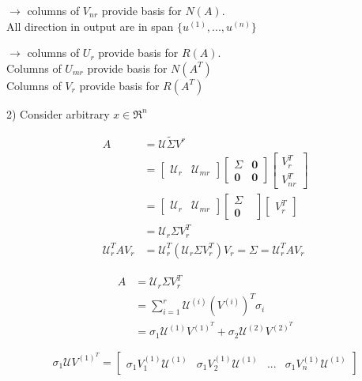 $\rightarrow$ columns of $V_{nr}$ provide basis for $N(A)$.\\


All direction in output are in span $\{u^{(1)} ,..., u^{(n)}\}$

$\rightarrow$ columns of $U_r$ provide basis for $R(A)$.\\

Columns of $U_{mr}$ provide basis for $N(A^T)$\\

Columns of $V_{r}$ provide basis for $R(A^T)$


2) Consider arbitrary $x\in \Re^n$

\begin{align*}
A &= \mathcal{U}\tilde{\Sigma}V^r\\
&= 
\begin{bmatrix}
\mathcal{U}_r & \mathcal{U}_{mr}
\end{bmatrix}
\begin{bmatrix}
\Sigma & \mathbf{0}\\
\mathbf{0} & \mathbf{0}
\end{bmatrix}
\begin{bmatrix}
V_r^T\\
V_{nr}^T
\end{bmatrix}\\
&= 
\begin{bmatrix}
\mathcal{U}_r & \mathcal{U}_{mr}
\end{bmatrix}
\begin{bmatrix}
\Sigma \\
\mathbf{0} & 
\end{bmatrix}
\begin{bmatrix}
V_r^T
\end{bmatrix}\\
&= \mathcal{U}_r\Sigma V_r^T\\
\mathcal{U}_r^TAV_r &= \mathcal{U}_r^T(\mathcal{U}_r\Sigma V_r^T)V_r = \Sigma = \mathcal{U}_r^TAV_r
\end{align*}


\begin{align}
A &= \mathcal{U}_r\Sigma V_r^T \\
&= \sum^r_{i=1}\mathcal{U}^{(i)}(V^{(i)})^T\sigma_i\\
&= \sigma_1\mathcal{U}^{(1)}V^{(1)^T}+ \sigma_2\mathcal{U}^{(2)}V^{(2)^T}
\end{align}

\begin{equation*}
\sigma_1\mathcal{U}V^{(1)^T} = 
\begin{bmatrix}
\sigma_1V_1^{(1)}\mathcal{U}^{(1)} & \sigma_1V_2^{(1)}\mathcal{U}^{(1)} & ... & \sigma_1V_n^{(1)}\mathcal{U}^{(1)}
\end{bmatrix}
\end{equation*}

